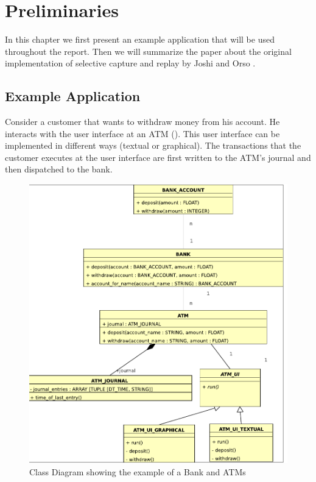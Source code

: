 \chapter{Preliminaries}
In this chapter we first present an example application that will be used throughout the report. Then we will summarize the paper about the original implementation of selective capture and replay by Joshi and Orso \cite{orso05may}.


\section{Example Application}
Consider a customer that wants to withdraw money from his account. He interacts with the user interface at an ATM (). This user interface can be implemented in different ways (textual or graphical). The transactions that the customer executes at the user interface are first written to the ATM's journal and then dispatched to the bank.
 \begin{figure}[ht]
   \centering
   \includegraphics[width=1\textwidth]{illustrations/example_class_diagram}
   \caption{Class Diagram showing the example of a Bank and ATMs}
   \label{fig:example_class_diagram}
\end{figure}


